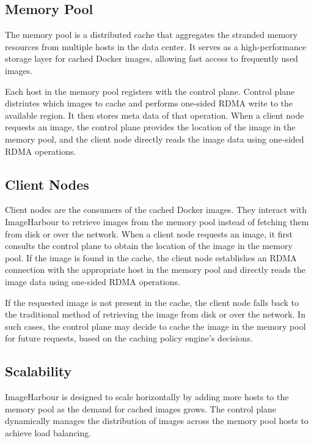 \subsection{Memory Pool}
The memory pool is a distributed cache that aggregates the stranded memory resources from multiple hosts in the data center. It serves as a high-performance storage layer for cached Docker images, allowing fast access to frequently used images.

Each host in the memory pool registers with the control plane. Control plane distriutes which images to cache and performs one-sided RDMA write to the available region. It then stores meta data of that operation. When a client node requests an image, the control plane provides the location of the image in the memory pool, and the client node directly reads the image data using one-sided RDMA operations.

\subsection{Client Nodes}
Client nodes are the consumers of the cached Docker images. They interact with ImageHarbour to retrieve images from the memory pool instead of fetching them from disk or over the network. When a client node requests an image, it first consults the control plane to obtain the location of the image in the memory pool. If the image is found in the cache, the client node establishes an RDMA connection with the appropriate host in the memory pool and directly reads the image data using one-sided RDMA operations.

If the requested image is not present in the cache, the client node falls back to the traditional method of retrieving the image from disk or over the network. In such cases, the control plane may decide to cache the image in the memory pool for future requests, based on the caching policy engine's decisions.

\subsection{Scalability}
ImageHarbour is designed to scale horizontally by adding more hosts to the memory pool as the demand for cached images grows. The control plane dynamically manages the distribution of images across the memory pool hosts to achieve load balancing.